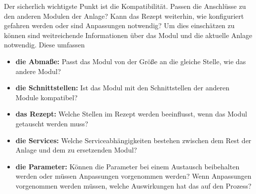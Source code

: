 Der sicherlich wichtigste Punkt ist die Kompatibilität. Passen die Anschlüsse zu den anderen Modulen der Anlage? Kann das Rezept weiterhin, wie konfiguriert gefahren werden oder sind Anpassungen notwendig? Um dies einschätzen zu können sind weitreichende Informationen über das Modul und die aktuelle Anlage notwendig. Diese umfassen
\begin{itemize}
\item \textbf{die Abmaße:} Passt das Modul von der Größe an die gleiche Stelle, wie das andere Modul?
\item \textbf{die Schnittstellen:} Ist das Modul mit den Schnittstellen der anderen Module kompatibel?
\item \textbf{das Rezept:} Welche Stellen im Rezept werden beeinflusst, wenn das Modul getauscht werden muss?
\item \textbf{die Services:} Welche Serviceabhängigkeiten bestehen zwischen dem Rest der Anlage und dem zu ersetzenden Modul?
\item \textbf{die Parameter:} Können die Parameter bei einem Austausch beibehalten werden oder müssen Anpassungen vorgenommen werden? Wenn Anpassungen vorgenommen werden müssen, welche Auswirkungen hat das auf den Prozess?
\end{itemize}

